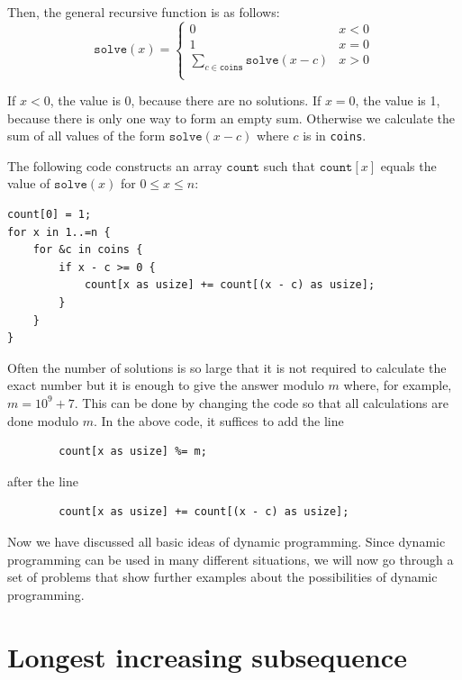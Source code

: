 Then, the general recursive function is as follows:
\begin{equation*}
    \texttt{solve}(x) = \begin{cases}
               0               & x < 0\\
               1               & x = 0\\
               \sum_{c \in \texttt{coins}} \texttt{solve}(x-c) & x > 0 \\
           \end{cases}
\end{equation*}

If $x<0$, the value is 0, because there are no solutions.
If $x=0$, the value is 1, because there is only one way
to form an empty sum.
Otherwise we calculate the sum of all values
of the form $\texttt{solve}(x-c)$ where $c$ is in \texttt{coins}.

The following code constructs an array
$\texttt{count}$ such that
$\texttt{count}[x]$ equals
the value of $\texttt{solve}(x)$
for $0 \le x \le n$:

\begin{lstlisting}
count[0] = 1;
for x in 1..=n {
    for &c in coins {
        if x - c >= 0 {
            count[x as usize] += count[(x - c) as usize];
        }
    }
}
\end{lstlisting}

Often the number of solutions is so large
that it is not required to calculate the exact number
but it is enough to give the answer modulo $m$
where, for example, $m=10^9+7$.
This can be done by changing the code so that
all calculations are done modulo $m$.
In the above code, it suffices to add the line
\begin{lstlisting}
        count[x as usize] %= m;
\end{lstlisting}
after the line
\begin{lstlisting}
        count[x as usize] += count[(x - c) as usize];
\end{lstlisting}

Now we have discussed all basic
ideas of dynamic programming.
Since dynamic programming can be used
in many different situations,
we will now go through a set of problems
that show further examples about the
possibilities of dynamic programming.

\section{Longest increasing subsequence}

